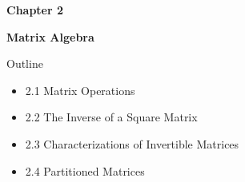\begin{frame}[plain]
  \vfill
  {\Huge\color{lecturegreen}\bfseries Chapter 2}
  \bigskip

  {\Huge\color{lecturegreen}\bfseries Matrix Algebra}
  \vfill
\end{frame}

\begin{frame}{Outline}
  \begin{itemize}
    \item 2.1 Matrix Operations
    \item 2.2 The Inverse of a Square Matrix
    \item 2.3 Characterizations of Invertible Matrices
    \item 2.4 Partitioned Matrices
  \end{itemize}
\end{frame}
